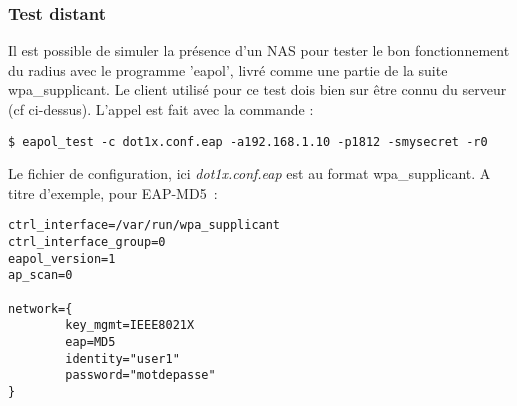 \subsubsection{Test distant}
Il est possible de simuler la présence d'un NAS pour tester le bon fonctionnement du radius avec le programme 'eapol', livré comme une partie de la suite wpa\_supplicant. Le client utilisé pour ce test dois bien sur être connu du serveur (cf ci-dessus). L'appel est fait avec la commande : 
\begin{verbatim}
$ eapol_test -c dot1x.conf.eap -a192.168.1.10 -p1812 -smysecret -r0
\end{verbatim} 
Le fichier de configuration, ici \emph{dot1x.conf.eap} est au format wpa\_supplicant. A titre d'exemple, pour EAP-MD5~:
\begin{verbatim}
ctrl_interface=/var/run/wpa_supplicant
ctrl_interface_group=0
eapol_version=1
ap_scan=0

network={
        key_mgmt=IEEE8021X
        eap=MD5
        identity="user1"
        password="motdepasse"
}
\end{verbatim}




